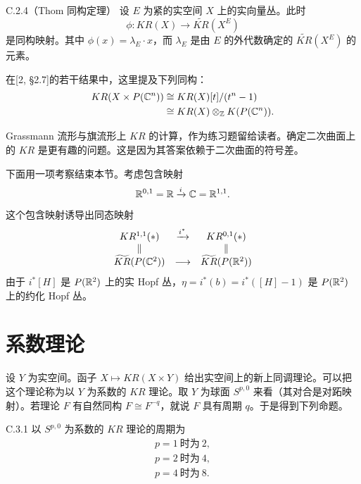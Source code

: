 \begin{theorem}{C.2.4}（Thom 同构定理）
  设 $E$ 为紧的实空间 $X$ 上的实向量丛。此时
\[
\phi\colon KR(X)\to\widetilde{KR}(X^E)
\]
是同构映射。其中 $\phi(x)=\lambda_E\cdot x$，而 $\lambda_E$ 是由 $E$ 的外代数确定的 $\widetilde{KR}(X^E)$ 的元素。
\end{theorem}

在[2, §2.7]的若干结果中，这里提及下列同构：
\begin{align*}
KR(X\times P(\mathbb{C}^n))&\cong KR(X)[t]/(t^n-1)\\
&\cong KR(X)\otimes_{\mathbb{Z}} K(P(\mathbb{C}^n)).
\end{align*}

Grassmann 流形与旗流形上 $KR$ 的计算，作为练习题留给读者。确定二次曲面上的 $KR$ 是更有趣的问题。这是因为其答案依赖于二次曲面的符号差。

下面用一项考察结束本节。考虑包含映射
\[
\mathbb{R}^{0,1}=\mathbb{R}\xrightarrow{i}\mathbb{C}=\mathbb{R}^{1,1}.
\]
这个包含映射诱导出同态映射
\[
\begin{array}{ccc}
KR^{1,1}(\ast) & \xrightarrow{i^*} & KR^{0,1}(\ast)\\
\Vert & & \Vert\\
\widetilde{KR}(P(\mathbb{C}^2)) & \longrightarrow & \widetilde{KR}(P(\mathbb{R}^2))
\end{array}
\]
由于 $i^*[H]$ 是 $P(\mathbb{R}^2)$ 上的实 Hopf 丛，$\eta=i^*(b)=i^*([H]-1)$ 是 $P(\mathbb{R}^2)$ 上的约化 Hopf 丛。

\section{系数理论}

设 $Y$ 为实空间。函子 $X\mapsto KR(X\times Y)$ 给出实空间上的新上同调理论。可以把这个理论称为以 $Y$ 为系数的 $KR$ 理论。取 $Y$ 为球面 $S^{p,0}$ 来看（其对合是对跖映射）。若理论 $F$ 有自然同构 $F\cong F^{-q}$，就说 $F$ 具有周期 $q$。于是得到下列命题。

\begin{proposition*}{C.3.1}
  以 $S^{p,0}$ 为系数的 $KR$ 理论的周期为
  \begin{gather*}
  p=1\ \text{时为}\ 2,\\
  p=2\ \text{时为}\ 4,\\
  p=4\ \text{时为}\ 8.
  \end{gather*}
\end{proposition*}

